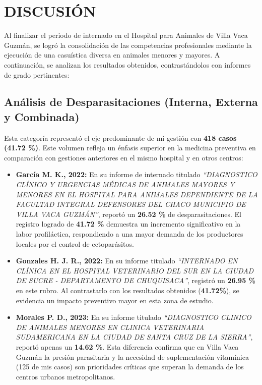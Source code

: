 \clearpage

\section{DISCUSIÓN}

	Al finalizar el periodo de internado en el Hospital para Animales de Villa Vaca Guzmán, se logró la consolidación de las competencias profesionales mediante la ejecución de una casuística diversa en animales menores y mayores. A continuación, se analizan los resultados obtenidos, contrastándolos con informes de grado pertinentes:

	\subsection{Análisis de Desparasitaciones (Interna, Externa y Combinada)}

	Esta categoría representó el eje predominante de mi gestión con \textbf{418 casos (41.72 \%)}. Este volumen refleja un énfasis superior en la medicina preventiva en comparación con gestiones anteriores en el mismo hospital y en otros centros:

	\begin{itemize}
		\item \textbf{García M. K., 2022:} En su informe de internado titulado \emph{“DIAGNOSTICO CLÍNICO Y URGENCIAS MÉDICAS DE ANIMALES MAYORES Y MENORES EN EL HOSPITAL PARA ANIMALES DEPENDIENTE DE LA FACULTAD INTEGRAL DEFENSORES DEL CHACO MUNICIPIO DE VILLA VACA GUZMÁN”}, reportó un \textbf{26.52 \%} de desparasitaciones. El registro logrado de \textbf{41.72 \%} demuestra un incremento significativo en la labor profiláctica, respondiendo a una mayor demanda de los productores locales por el control de ectoparásitos.
		\item \textbf{Gonzales H. J. R., 2022:} En su informe titulado \emph{“INTERNADO EN CLÍNICA EN EL HOSPITAL VETERINARIO DEL SUR EN LA CIUDAD DE SUCRE - DEPARTAMENTO DE CHUQUISACA”}, registró un \textbf{26.95 \%} en este rubro. Al contrastarlo con los resultados obtenidos (\textbf{41.72\%}), se evidencia un impacto preventivo mayor en esta zona de estudio.
		\item \textbf{Morales P. D., 2023:} En su informe titulado \emph{“DIAGNOSTICO CLINICO DE ANIMALES MENORES EN CLINICA VETERINARIA SUDAMERICANA EN LA CIUDAD DE SANTA CRUZ DE LA SIERRA”}, reportó apenas un \textbf{14.62 \%}. Esta diferencia confirma que en Villa Vaca Guzmán la presión parasitaria y la necesidad de suplementación vitamínica (125 de mis casos) son prioridades críticas que superan la demanda de los centros urbanos metropolitanos.
	\end{itemize}


